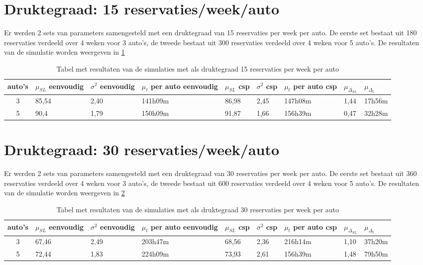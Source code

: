 \section{Druktegraad: 15 reservaties/week/auto}
Er werden 2 sets van parameters samengesteld met een druktegraad van 15 reservaties per week per auto. 
De eerste set bestaat uit 180 reservaties verdeeld over 4 weken voor 3 auto's, de tweede bestaat uit 300 reservaties verdeeld over 4 weken voor 5 auto's. 
De resultaten van de simulatie worden weergeven in \ref{tab:resultaten15}
\begin{table}[h]
	\centering
	\begin{tabular}{ | c | p{1.5cm} | p{1.5cm} | p{1.5cm} | p{1.5cm} | p{1.5cm} | p{1.5cm} | p{1.5cm} | p{1.5cm} |}
		\hline
		auto's & $\mu_{ SL}$ eenvoudig & $\sigma^2$ eenvoudig & $\mu_{ t}$ per auto eenvoudig & $\mu_{ SL}$ csp & $\sigma^2$ csp & $\mu_{ t}$ per auto csp & $\mu_{\Delta_{ SL}}$ & $\mu_{\Delta_{ t}}$ \\ \hline
		3 & 85,54 & 2,40 & 141h09m & 86,98 & 2,45 & 147h08m & 1,44 & 17h56m  \\ \hline
		5 & 90,4 & 1,79 & 150h09m & 91,87 & 1,66 & 156h39m & 0,47 & 32h28m \\ \hline
	\end{tabular}
	\caption{Tabel met resultaten van de simulaties met als druktegraad 15 reservaties per week per auto}
	\label{tab:resultaten15}
\end{table}
\section{Druktegraad: 30 reservaties/week/auto}
Er werden 2 sets van parameters samengesteld met een druktegraad van 30 reservaties per week per auto. 
De eerste set bestaat uit 360 reservaties verdeeld over 4 weken voor 3 auto's, de tweede bestaat uit 600 reservaties verdeeld over 4 weken voor 5 auto's. 
De resultaten van de simulatie worden weergeven in \ref{tab:resultaten30}
\begin{table}[h]
	\centering
	\begin{tabular}{ | c | p{1.5cm} | p{1.5cm} | p{1.5cm} | p{1.5cm} | p{1.5cm} | p{1.5cm} | p{1.5cm} | p{1.5cm} |}
		\hline
		auto's & $\mu_{ SL}$ eenvoudig & $\sigma^2$ eenvoudig & $\mu_{ t}$ per auto eenvoudig & $\mu_{ SL}$ csp & $\sigma^2$ csp & $\mu_{ t}$ per auto csp & $\mu_{\Delta_{ SL}}$ & $\mu_{\Delta_{ t}}$ \\ \hline
		3 & 67,46 & 2,49 & 203h47m & 68,56 & 2,36 & 216h14m & 1,10 & 37h20m  \\ \hline
		5 & 72,44 & 1,83 & 224h09m & 73,93 & 2,61 & 156h39m & 1,48 & 79h50m \\ \hline
	\end{tabular}
	\caption{Tabel met resultaten van de simulaties met als druktegraad 30 reservaties per week per auto}
	\label{tab:resultaten30}
\end{table}

